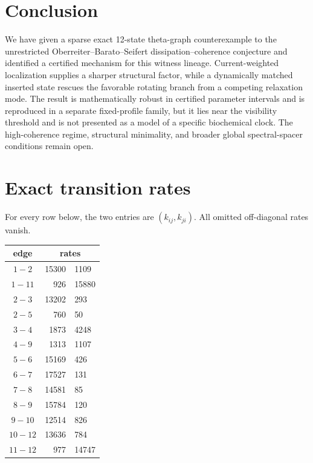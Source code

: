 \documentclass[aps,pre,reprint,groupedaddress,nofootinbib,showkeys,floatfix]{revtex4-2}
\begin{document}
\section{Conclusion}
We have given a sparse exact 12-state theta-graph counterexample to the unrestricted Oberreiter--Barato--Seifert dissipation--coherence conjecture and identified a certified mechanism for this witness lineage. Current-weighted localization supplies a sharper structural factor, while a dynamically matched inserted state rescues the favorable rotating branch from a competing relaxation mode. The result is mathematically robust in certified parameter intervals and is reproduced in a separate fixed-profile family, but it lies near the visibility threshold and is not presented as a model of a specific biochemical clock. The high-coherence regime, structural minimality, and broader global spectral-spacer conditions remain open.

\appendix
\section{Exact transition rates}\label{app:rates}
For every row below, the two entries are $(k_{ij},k_{ji})$. All omitted off-diagonal rates vanish.
\begin{center}
\begin{longtable}{c@{\qquad}r@{\,,\,}l}
\toprule
edge & \multicolumn{2}{c}{rates}\\
\midrule
$1-2$ & 15300 & 1109\\
$1-11$ & 926 & 15880\\
$2-3$ & 13202 & 293\\
$2-5$ & 760 & 50\\
$3-4$ & 1873 & 4248\\
$4-9$ & 1313 & 1107\\
$5-6$ & 15169 & 426\\
$6-7$ & 17527 & 131\\
$7-8$ & 14581 & 85\\
$8-9$ & 15784 & 120\\
$9-10$ & 12514 & 826\\
$10-12$ & 13636 & 784\\
$11-12$ & 977 & 14747\\
\bottomrule
\end{longtable}
\end{center}
\end{document}
